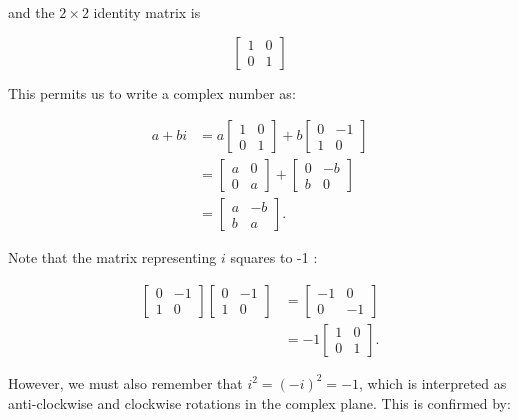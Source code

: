 and the $2 \times 2$ identity matrix is

$$
\left[\begin{array}{ll}
1 & 0 \\
0 & 1
\end{array}\right]
$$

This permits us to write a complex number as:

$$
\begin{aligned}
a+b i & =a\left[\begin{array}{ll}
1 & 0 \\
0 & 1
\end{array}\right]+b\left[\begin{array}{cc}
0 & -1 \\
1 & 0
\end{array}\right] \\
& =\left[\begin{array}{ll}
a & 0 \\
0 & a
\end{array}\right]+\left[\begin{array}{cc}
0 & -b \\
b & 0
\end{array}\right] \\
& =\left[\begin{array}{cc}
a & -b \\
b & a
\end{array}\right] .
\end{aligned}
$$

Note that the matrix representing $i$ squares to -1 :

$$
\begin{aligned}
{\left[\begin{array}{cc}
0 & -1 \\
1 & 0
\end{array}\right]\left[\begin{array}{cc}
0 & -1 \\
1 & 0
\end{array}\right] } & =\left[\begin{array}{cc}
-1 & 0 \\
0 & -1
\end{array}\right] \\
& =-1\left[\begin{array}{ll}
1 & 0 \\
0 & 1
\end{array}\right] .
\end{aligned}
$$

However, we must also remember that $i^{2}=(-i)^{2}=-1$, which is interpreted as anti-clockwise and clockwise rotations in the complex plane. This is confirmed by:

